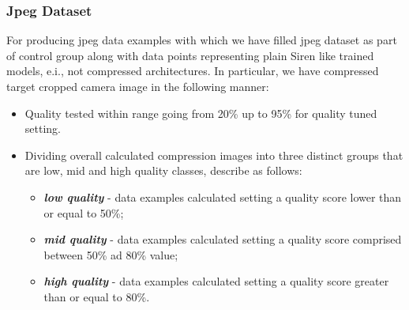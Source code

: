 



\begin{frame}
\frametitle{Jpeg Dataset}
For producing jpeg data examples with which we have filled jpeg dataset as part of control group along with data points representing plain Siren like trained models, e.i., not compressed architectures.
In particular, we have compressed target cropped camera image in the following manner:
\begin{itemize}
\item Quality tested within range going from 20\% up to 95\% for quality tuned setting.
\item Dividing overall calculated compression images into three distinct groups that are low, mid and high quality classes, describe as follows:
	\begin{itemize}
		\item \textbf{\textit{low quality}} -  data examples calculated setting a quality score lower than or equal to 50\%;
		\item \textbf{\textit{mid quality}} -  data examples calculated setting a quality score comprised between 50\% ad 80\% value;
		\item \textbf{\textit{high quality}} -  data examples calculated setting a quality score greater than or equal to 80\%.
	\end{itemize}
\end{itemize}

\end{frame}